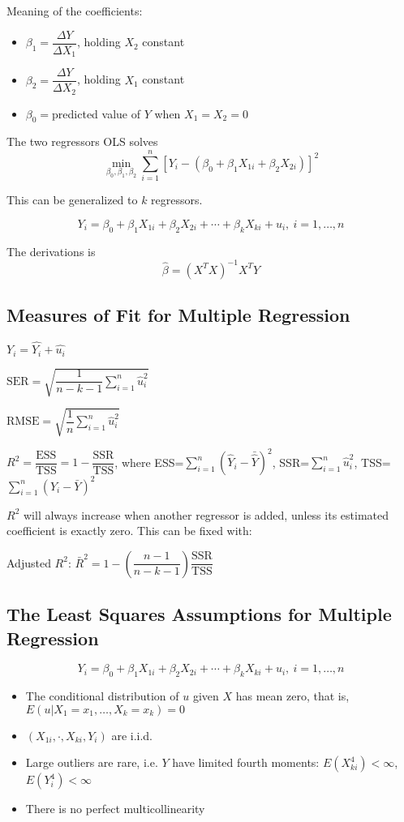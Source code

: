 \documentclass{article}
\newcommand{\sumlimits}{\sum \limits _{i=1}^{n}}
\begin{document}
Meaning of the coefficients:
\begin{itemize}
	\item $\beta_1 = \dfrac{\Delta Y}{\Delta X_1}$, holding $X_2$ constant
	\item $\beta_2 = \dfrac{\Delta Y}{\Delta X_2}$, holding $X_1$ constant
	\item $\beta_0 = $predicted value of $Y$ when $X_1 = X_2 = 0$
\end{itemize}

The two regressors OLS solves
\[
	\min_{\beta_0, \beta_1, \beta_2} \sumlimits \left[
		Y_i - \left(
		\beta_0 + \beta_1 X_{1i} + \beta_2 X_{2i}
		\right)
		\right]^2
\]

This can be generalized to $k$ regressors.

\[
	Y_i = \beta_0 + \beta_1 X_{1i} + \beta_2 X_{2i} +
	\cdots + \beta_k X_{ki} + u_i,\ i=1,\ldots, n
\]

The derivations is
\[
	\hat{\beta} = \left(X^T X\right)^{-1} X^T Y
\]

\subsection{Measures of Fit for Multiple Regression}

$Y_i = \hat{Y_i}+ \hat{u_i}$

$\text{SER} = \sqrt{
		\dfrac{1}{n-k-1} \sumlimits \hat{u}_i ^ 2
	}$

$\text{RMSE} = \sqrt{
		\dfrac{1}{n} \sumlimits \hat{u}^2_i
	}$

$R^2 = \dfrac{\text{ESS}}{\text{TSS}} = 1 - \dfrac{\text{SSR}}{\text{TSS}}
$, where ESS=$\sumlimits(\hat{Y}_i - \bar{\hat{Y}})^2$,
SSR=$\sumlimits \hat{u}_i^2$,
TSS=$\sumlimits (Y_i - \bar{Y})^2$

$R^2$ will always increase when another regressor is added,
unless its estimated coefficient is exactly zero.
This can be fixed with:

Adjusted $R^2$: $\bar{R}^2 = 1 - \left(
	\dfrac{n-1}{n-k-1}
	\right) \dfrac{\text{SSR}}{\text{TSS}}$


\subsection{The Least Squares Assumptions for Multiple Regression}

\[
	Y_i = \beta_0 + \beta_1 X_{1i} + \beta_2 X_{2i} +
	\cdots + \beta_k X_{ki} + u_i,\ i=1,\ldots, n
\]

\begin{itemize}
	\item The conditional distribution of $u$ given $X$ has mean zero, that is, $E(u|X_1=x_1, \ldots, X_k=x_k) = 0$
	\item $(X_{1i}, \cdot, X_{ki}, Y_i)$ are i.i.d.
	\item Large outliers are rare, i.e. $Y$ have limited fourth moments: $E(X^4_{ki})<\infty$, $E(Y^4_i)<\infty$
	\item There is no perfect multicollinearity
\end{itemize}
\end{document}
